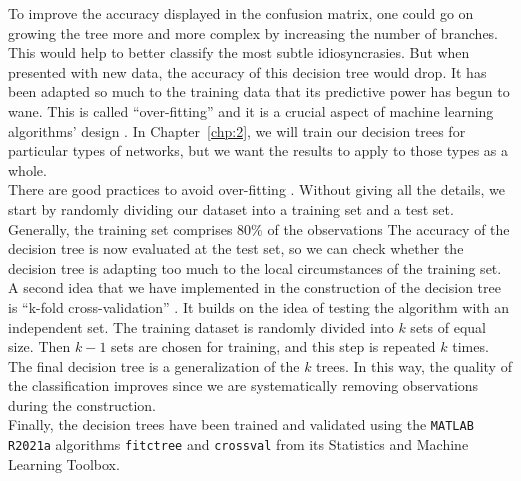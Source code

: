 To improve the accuracy displayed in the confusion matrix, one could go on growing the tree more and more complex by increasing the number of branches. This would help to better classify the most subtle idiosyncrasies. But when presented with new data, the accuracy of this decision tree would drop. It has been adapted so much to the training data that its predictive power has begun to wane. This is called ``over-fitting'' and it is a crucial aspect of machine learning algorithms' design \cite{spiegelhalter2019art}. In Chapter~\ref{chp:2}, we will train our decision trees for particular types of networks, but we want the results to apply to those types as a whole. \\

There are good practices to avoid over-fitting  \cite{spiegelhalter2019art}. Without giving all the details, we start by randomly dividing our dataset into a training set and a test set. Generally, the training set comprises $80\%$ of the observations The accuracy of the decision tree is now evaluated at the test set, so we can check whether the decision tree is adapting too much to the local circumstances of the training set. A second idea that we have implemented in the construction of the decision tree is ``k-fold cross-validation'' \cite{crossval}. It builds on the idea of testing the algorithm with an independent set. The training dataset is randomly divided into $k$ sets of equal size. Then $k-1$ sets are chosen for training, and this step is repeated $k$ times. The final decision tree is a generalization of the $k$ trees. In this way, the quality of the classification improves since we are systematically removing observations during the construction. \\

Finally, the decision trees have been trained and validated using the \texttt{MATLAB R2021a} algorithms  \texttt{fitctree} \cite{fitctree} and \texttt{crossval} \cite{crossval} from its Statistics and Machine Learning Toolbox.
